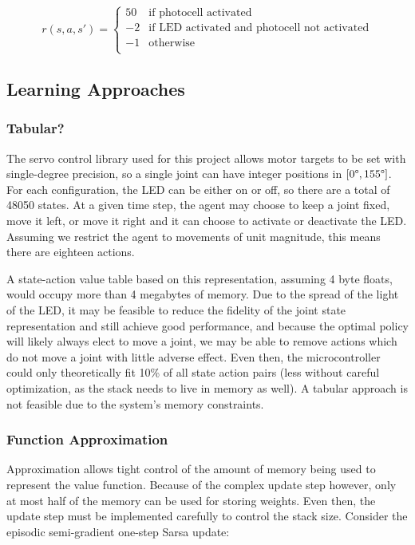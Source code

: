 \documentclass{article}
\begin{document}
\[ r(s,a,s') =  \left\{
\begin{array}{ll}
	50 & \text{if photocell activated} \\
	-2 & \text{if LED activated and photocell not activated} \\
	-1 & \text{otherwise} \\
\end{array} 
\right. \]


\subsection{Learning Approaches}

\subsubsection{Tabular?}

The servo control library used for this project allows motor targets to be set with single-degree precision, so a single joint can have integer positions in  $[0\degree, 155\degree]$. For each configuration, the LED can be either on or off, so there are a total of 48050 states. At a given time step, the agent may choose to keep a joint fixed, move it left, or move it right and it can choose to activate or deactivate the LED. Assuming we restrict the agent to movements of unit magnitude, this means there are eighteen actions.

A state-action value table based on this representation, assuming 4 byte floats, would occupy more than 4 megabytes of memory. Due to the spread of the light of the LED, it may be feasible to reduce the fidelity of the joint state representation and still achieve good performance, and because the optimal policy will likely always elect to move a joint, we may be able to remove actions which do not move a joint with little adverse effect. Even then, the microcontroller could only theoretically fit 10\% of all state action pairs (less without careful optimization, as the stack needs to live in memory as well). A tabular approach is not feasible due to the system's memory constraints.

\subsubsection{Function Approximation}

Approximation allows tight control of the amount of memory being used to represent the value function. Because of the complex update step however, only at most half of the memory can be used for storing weights. Even then, the update step must be implemented carefully to control the stack size. Consider the episodic semi-gradient one-step Sarsa update:
\end{document}
